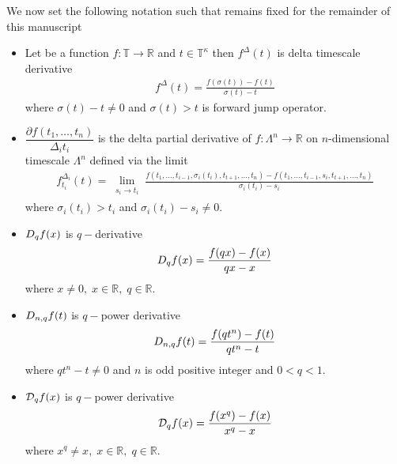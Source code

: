 We now set the following notation such that remains fixed for the remainder of this manuscript
\begin{itemize}
    \setlength\itemsep{1.6em}
    \item Let be a function $f\colon \mathbb{T} \to \mathbb{R}$ and $t\in\mathbb{T}^{\kappa}$ then $f^{\Delta}(t)$
    is delta timescale derivative~\cite{Bohner2001DynamicEO}
    \begin{align*}
        f^{\Delta} (t) = \frac{f(\sigma(t)) - f(t)}{\sigma(t) - t}
    \end{align*}
    where $\sigma(t) - t \neq 0$ and $\sigma(t) > t$ is forward jump operator.

    \item $\dfrac{\partial f(t_1,\ldots,t_n)}{\Delta_i t_i}$ is the delta partial derivative
    of $f\colon \Lambda^n \to \mathbb{R}$ on $n$-dimensional timescale
    $\Lambda^n$ defined via the limit~\cite{bohner2004partial, ahlbrandt2002partial,JACKSON2006391}
    \begin{align*}
        f^{\Delta_i}_{t_i}(t) = \lim \limits_{\substack{s_i \to t_i}}
        \frac{
            f(t_1, \ldots, t_{i-1}, \sigma_i(t_i), t_{t+1}, \ldots, t_n)
            - f(t_1, \ldots, t_{i-1}, s_i, t_{t+1}, \ldots, t_n)
        }{\sigma_i(t_i) - s_i}
    \end{align*}
    where $\sigma_i(t_i) > t_i$ and $\sigma_i(t_i) - s_i \neq 0$.

    \item $D_{q} f(x)$ is $q-$derivative~\cite{jackson_1909,ernst2000history,ernst2008different,kac2001quantum}
    \begin{align*}
        D_{q} f(x) = \frac{f(qx)-f(x)}{qx-x}
    \end{align*}
    where $x\neq 0, \; x\in\mathbb{R}, \; q\in\mathbb{R}$.

    \item $D_{n,q} f(t)$ is $q-$power derivative~\cite{aldwoah2011power}
    \begin{align*}
        D_{n,q} f(t) = \frac{f(qt^n) - f(t)}{qt^n - t}
    \end{align*}
    where $qt^n - t \neq 0$ and $n$ is odd positive integer and $0 < q < 1$.

    \item $\mathcal{D}_q f(x)$ is $q-$power derivative
    \begin{align*}
        \mathcal{D}_q f(x) = \frac{f(x^q)-f(x)}{x^q-x}
    \end{align*}
    where $x^q \neq x, \; x\in\mathbb{R}, \; q\in\mathbb{R}$.


\end{itemize}

